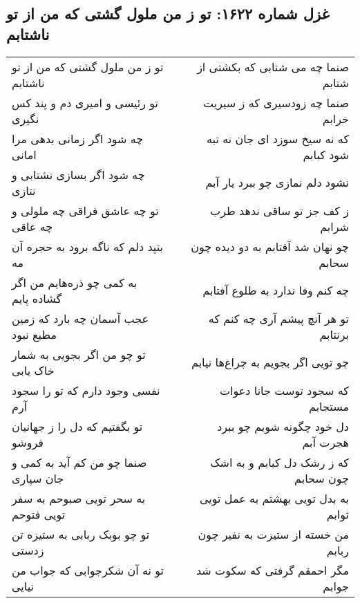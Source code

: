 \begin{center}
\section*{غزل شماره ۱۶۲۲: تو ز من ملول گشتی که من از تو ناشتابم}
\label{sec:1622}
\begin{longtable}{l p{0.5cm} r}
تو ز من ملول گشتی که من از تو ناشتابم
&&
صنما چه می شتابی که بکشتی از شتابم
\\
تو رئیسی و امیری دم و پند کس نگیری
&&
صنما چه زودسیری که ز سیریت خرابم
\\
چه شود اگر زمانی بدهی مرا امانی
&&
که نه سیخ سوزد ای جان نه تبه شود کبابم
\\
چه شود اگر بسازی نشتابی و نتازی
&&
نشود دلم نمازی چو ببرد یار آبم
\\
تو چه عاشق فراقی چه ملولی و چه عاقی
&&
ز کف جز تو ساقی ندهد طرب شرابم
\\
بتپد دلم که ناگه برود به حجره آن مه
&&
چو نهان شد آفتابم به دو دیده چون سحابم
\\
به کمی چو ذره‌هایم من اگر گشاده پایم
&&
چه کنم وفا ندارد به طلوع آفتابم
\\
عجب آسمان چه بارد که زمین مطیع نبود
&&
تو هر آنچ پیشم آری چه کنم که برنتابم
\\
تو چو من اگر بجویی به شمار خاک یابی
&&
چو تویی اگر بجویم به چراغ‌ها نیابم
\\
نفسی وجود دارم که تو را سجود آرم
&&
که سجود توست جانا دعوات مستجابم
\\
تو بگفتیم که دل را ز جهانیان فروشو
&&
دل خود چگونه شویم چو ببرد هجرت آبم
\\
صنما چو من کم آید به کمی و جان سپاری
&&
که ز رشک دل کبابم و به اشک چون سحابم
\\
به سحر تویی صبوحم به سفر تویی فتوحم
&&
به بدل تویی بهشتم به عمل تویی ثوابم
\\
تو چو بوبک ربابی به ستیزه تن زدستی
&&
من خسته از ستیزت به نفیر چون ربابم
\\
تو نه آن شکرجوابی که جواب من نیایی
&&
مگر احمقم گرفتی که سکوت شد جوابم
\\
\end{longtable}
\end{center}
